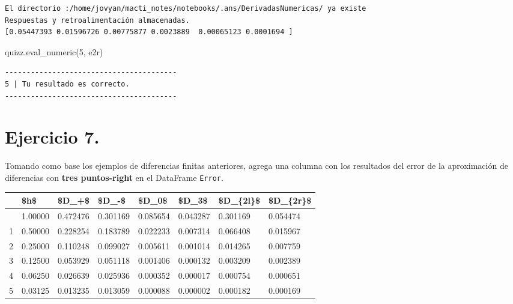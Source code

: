 \documentclass[
  letterpaper,
  DIV=11,
  numbers=noendperiod]{scrreprt}
\newenvironment{Shaded}{\begin{snugshade}}{\end{snugshade}}
\newcommand{\CommentTok}[1]{\textcolor[rgb]{0.37,0.37,0.37}{#1}}
\newcommand{\NormalTok}[1]{\textcolor[rgb]{0.00,0.23,0.31}{#1}}
\newcommand{\OperatorTok}[1]{\textcolor[rgb]{0.37,0.37,0.37}{#1}}
\newcommand{\RegionMarkerTok}[1]{\textcolor[rgb]{0.00,0.23,0.31}{#1}}
\newcommand{\SpecialCharTok}[1]{\textcolor[rgb]{0.37,0.37,0.37}{#1}}
\newcommand{\StringTok}[1]{\textcolor[rgb]{0.13,0.47,0.30}{#1}}
\begin{document}
\begin{verbatim}
El directorio :/home/jovyan/macti_notes/notebooks/.ans/DerivadasNumericas/ ya existe
Respuestas y retroalimentación almacenadas.
[0.05447393 0.01596726 0.00775877 0.0023889  0.00065123 0.0001694 ]
\end{verbatim}

\begin{Shaded}
\begin{Highlighting}[]
\NormalTok{quizz.eval\_numeric(}\StringTok{\textquotesingle{}5\textquotesingle{}}\NormalTok{, e2r)}
\end{Highlighting}
\end{Shaded}

\begin{verbatim}
----------------------------------------
5 | Tu resultado es correcto.
----------------------------------------
\end{verbatim}

\section{Ejercicio 7.}\label{ejercicio-7.-1}

Tomando como base los ejemplos de diferencias finitas anteriores, agrega
una columna con los resultados del error de la aproximación de
diferencias con \textbf{tres puntos-right} en el DataFrame
\texttt{Error}.

\begin{Shaded}
\end{Shaded}

\begin{longtable}[]{@{}llllllll@{}}
\toprule\noalign{}
& \$h\$ & \$D\_+\$ & \$D\_-\$ & \$D\_0\$ & \$D\_3\$ & \$D\_\{2l\}\$ &
\$D\_\{2r\}\$ \\
\midrule\noalign{}
\endhead
\bottomrule\noalign{}
\endlastfoot
0 & 1.00000 & 0.472476 & 0.301169 & 0.085654 & 0.043287 & 0.301169 &
0.054474 \\
1 & 0.50000 & 0.228254 & 0.183789 & 0.022233 & 0.007314 & 0.066408 &
0.015967 \\
2 & 0.25000 & 0.110248 & 0.099027 & 0.005611 & 0.001014 & 0.014265 &
0.007759 \\
3 & 0.12500 & 0.053929 & 0.051118 & 0.001406 & 0.000132 & 0.003209 &
0.002389 \\
4 & 0.06250 & 0.026639 & 0.025936 & 0.000352 & 0.000017 & 0.000754 &
0.000651 \\
5 & 0.03125 & 0.013235 & 0.013059 & 0.000088 & 0.000002 & 0.000182 &
0.000169 \\
\end{longtable}
\end{document}
